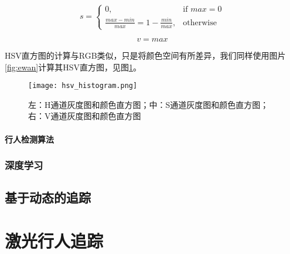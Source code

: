 $$s={\begin{cases}0,&{\mbox{if }}max=0\\{\frac  {max-min}{max}}=1-{\frac  {min}{max}},&{\mbox{otherwise}}\end{cases}}$$

$$
v=max
$$

  HSV直方图的计算与RGB类似，只是将颜色空间有所差异，我们同样使用图片\ref{fig:ewan}计算其HSV直方图，见图\ref{fig:hsvhistogram}。

\begin{figure}[htb]
  \centering
  \texttt{[image: hsv\_histogram.png]}
  \caption{左：H通道灰度图和颜色直方图；中：S通道灰度图和颜色直方图；右：V通道灰度图和颜色直方图}
  \label{fig:hsvhistogram}
\end{figure}


\paragraph{行人检测算法}

\subsubsection{深度学习}

\subsection{基于动态的追踪}


\section{激光行人追踪}


